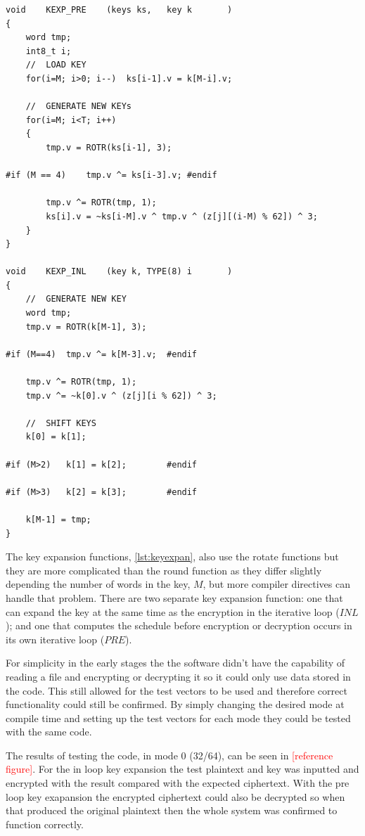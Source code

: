 \documentclass[12pt,twoside,a4paper]{report}
\begin{document}
	\begin{minipage}{\linewidth}
	\begin{lstlisting}[label={lst:keyexpan},caption={Key Expansion Functions},style=CStyle]
void	KEXP_PRE	(keys ks,	key k		)
{
	word tmp;
	int8_t i;
	//	LOAD KEY
	for(i=M; i>0; i--)	ks[i-1].v = k[M-i].v;
	
	//	GENERATE NEW KEYs
	for(i=M; i<T; i++)
	{
		tmp.v = ROTR(ks[i-1], 3);
		
#if (M == 4)	tmp.v ^= ks[i-3].v;	#endif

		tmp.v ^= ROTR(tmp, 1);
		ks[i].v = ~ks[i-M].v ^ tmp.v ^ (z[j][(i-M) % 62]) ^ 3;
	}
}

void	KEXP_INL	(key k,	TYPE(8) i		)
{
	//	GENERATE NEW KEY	
	word tmp;
	tmp.v = ROTR(k[M-1], 3);
	
#if (M==4)	tmp.v ^= k[M-3].v;	#endif

	tmp.v ^= ROTR(tmp, 1);
	tmp.v ^= ~k[0].v ^ (z[j][i % 62]) ^ 3;
	
	//	SHIFT KEYS
	k[0] = k[1];
	
#if (M>2)	k[1] = k[2];		#endif

#if (M>3)	k[2] = k[3];		#endif

	k[M-1] = tmp;
}
	\end{lstlisting}
	\end{minipage}
	
	The key expansion functions, \autoref{lst:keyexpan}, also use the rotate functions but they are more complicated than the round function as they differ slightly depending the number of words in the key, $M$, but more compiler directives can handle that problem. There are two separate key expansion function: one that can expand the key at the same time as the encryption in the iterative loop ($INL$); and one that computes the schedule before encryption or decryption occurs in its own iterative loop ($PRE$).
    
	For simplicity in the early stages the the software didn't have the capability of reading a file and encrypting or decrypting it so it could only use data stored in the code. This still allowed for the test vectors to be used and therefore correct functionality could still be confirmed.  By simply changing the desired mode at compile time and setting up the test vectors for each mode they could be tested with the same code.
	
	The results of testing the code, in mode 0 (32/64), can be seen in \textcolor{red}{[reference figure]}. For the in loop key expansion the test plaintext and key was inputted and encrypted with the result compared with the expected ciphertext. With the pre loop key exapansion the encrypted ciphertext could also be decrypted so when that produced the original plaintext then the whole system was confirmed to function correctly.
	
\end{document}
